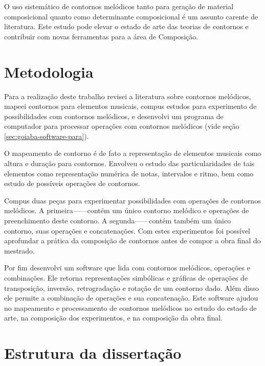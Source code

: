 O uso sistemático de contornos melódicos tanto para geração de
material composicional quanto como determinante composicional é um
assunto carente de literatura. Este estudo pode elevar o estado de
arte das teorias de contornos e contribuir com novas ferramentas para
a área de Composição.

\section{Metodologia}
\label{sec:metodologia}


Para a realização deste trabalho revisei a literatura sobre contornos
melódicos, mapeei contornos para elementos musicais, compus estudos
para experimento de possibilidades com contornos melódicos, e
desenvolvi um programa de computador para processar operações com
contornos melódicos (vide seção \ref{sec:goiaba-software-para}).

O mapeamento de contorno é de fato a representação de elementos
musicais como altura e duração para contornos. Envolveu o estudo das
particularidades de tais elementos como representação numérica de
notas, intervalos e ritmo, bem como estudo de possíveis operações de
contornos.

Compus duas peças para experimentar possibilidades com operações de
contornos melódicos. A primeira------contém um único contorno melódico e
operações de preenchimento deste contorno. A segunda------contém também um único contorno, suas operações e
concatenações. Com estes experimentos foi possível aprofundar a
prática da composição de contornos antes de compor a obra final do
mestrado.

Por fim desenvolvi um software que lida com contornos melódicos,
operações e combinações. Ele retorna representações simbólicas e
gráficas de operações de transposição, inversão, retrogradação e
rotação de um contorno dado. Além disso ele permite a combinação de
operações e sua concatenação. Este software ajudou no mapeamento e
processamento de contornos melódicos no estudo do estado de arte, na
composição dos experimentos, e na composição da obra final.

\section{Estrutura da dissertação}
\label{sec:estr-da-diss}

